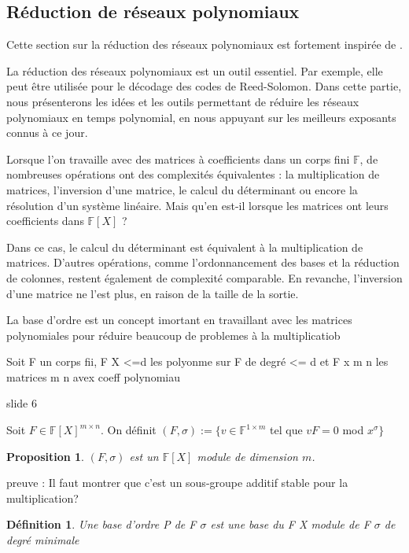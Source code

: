 \documentclass[a4paper,12pt]{report}  %
\theoremstyle{definitionstyle}
\newtheorem{definition}{Définition}[chapter] %
\theoremstyle{examplestyle}
\theoremstyle{remarkstyle}
\theoremstyle{propositionstyle}
\newtheorem{proposition}{Proposition}[chapter]  %
\theoremstyle{theoremstyle}
\theoremstyle{proofstyle}
\begin{document}
	\subsection{Réduction de réseaux polynomiaux}
	Cette section sur la réduction des réseaux polynomiaux est fortement inspirée de \cite{CCLebreton}.  
	
	La réduction des réseaux polynomiaux est un outil essentiel. Par exemple, elle peut être utilisée pour le décodage des codes de Reed-Solomon. Dans cette partie, nous présenterons les idées et les outils permettant de réduire les réseaux polynomiaux en temps polynomial, en nous appuyant sur les meilleurs exposants connus à ce jour.  
	
	Lorsque l'on travaille avec des matrices à coefficients dans un corps fini \(\mathbb{F}\), de nombreuses opérations ont des complexités équivalentes : la multiplication de matrices, l'inversion d'une matrice, le calcul du déterminant ou encore la résolution d'un système linéaire. Mais qu'en est-il lorsque les matrices ont leurs coefficients dans \(\mathbb{F}[X]\) ?  
	
	Dans ce cas, le calcul du déterminant est équivalent à la multiplication de matrices. D'autres opérations, comme l'ordonnancement des bases et la réduction de colonnes, restent également de complexité comparable. En revanche, l'inversion d'une matrice ne l'est plus, en raison de la taille de la sortie.
	
	
	La base d'ordre est un concept imortant en travaillant avec les matrices polynomiales pour réduire beaucoup de problemes à la multiplicatiob
	
	Soit F un corps fii, F X <=d les polyonme sur F de degré <= d et F x m n les matrices m n avex coeff polynomiau
	
	slide 6
	
	
	Soit $F \in \mathbb{F}[X]^{m \times n}$. On définit $(F, \sigma):= \{v \in \mathbb{F}^{1 \times m}$ tel que $ vF = 0$ mod $x^\sigma\}$
	
	\begin{proposition}
		$(F, \sigma)$ est un $\mathbb{F}[X]$ module de dimension $m$.
	\end{proposition}

	preuve : Il faut montrer que c'est un sous-groupe additif stable pour la multiplication?
	
	
	\begin{definition}
		Une base d'ordre P de F $\sigma$
		 est une base du F X module de F $\sigma$ de degré minimale
	\end{definition}
	
\end{document}
